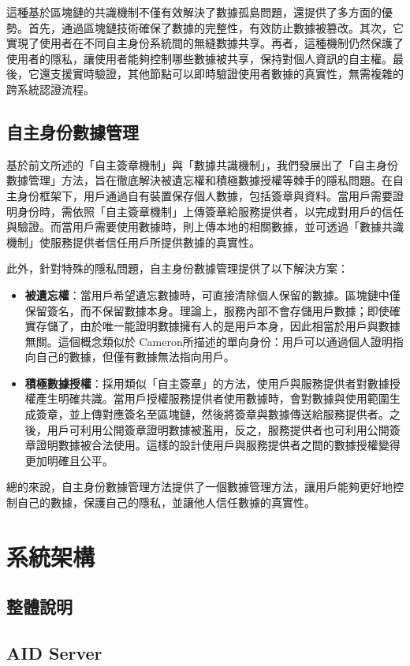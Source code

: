 這種基於區塊鏈的共識機制不僅有效解決了數據孤島問題，還提供了多方面的優勢。首先，通過區塊鏈技術確保了數據的完整性，有效防止數據被篡改。其次，它實現了使用者在不同自主身份系統間的無縫數據共享。再者，這種機制仍然保護了使用者的隱私，讓使用者能夠控制哪些數據被共享，保持對個人資訊的自主權。最後，它還支援實時驗證，其他節點可以即時驗證使用者數據的真實性，無需複雜的跨系統認證流程。
\subsection{自主身份數據管理}
基於前文所述的「自主簽章機制」與「數據共識機制」，我們發展出了「自主身份數據管理」方法，旨在徹底解決被遺忘權和積極數據授權等棘手的隱私問題。在自主身份框架下，用戶通過自有裝置保存個人數據，包括簽章與資料。當用戶需要證明身份時，需依照「自主簽章機制」上傳簽章給服務提供者，以完成對用戶的信任與驗證。而當用戶需要使用數據時，則上傳本地的相關數據，並可透過「數據共識機制」使服務提供者信任用戶所提供數據的真實性。

此外，針對特殊的隱私問題，自主身份數據管理提供了以下解決方案：
\begin{itemize}
  \item \textbf{被遺忘權}：當用戶希望遺忘數據時，可直接清除個人保留的數據。區塊鏈中僅保留簽名，而不保留數據本身。理論上，服務內部不會存儲用戶數據；即使確實存儲了，由於唯一能證明數據擁有人的是用戶本身，因此相當於用戶與數據無關。這個概念類似於 Cameron\cite{cameron2005laws}所描述的單向身份：用戶可以通過個人證明指向自己的數據，但僅有數據無法指向用戶。
  \item \textbf{積極數據授權}：採用類似「自主簽章」的方法，使用戶與服務提供者對數據授權產生明確共識。當用戶授權服務提供者使用數據時，會對數據與使用範圍生成簽章，並上傳對應簽名至區塊鏈，然後將簽章與數據傳送給服務提供者。之後，用戶可利用公開簽章證明數據被濫用，反之，服務提供者也可利用公開簽章證明數據被合法使用。這樣的設計使用戶與服務提供者之間的數據授權變得更加明確且公平。
\end{itemize}

總的來說，自主身份數據管理方法提供了一個數據管理方法，讓用戶能夠更好地控制自己的數據，保護自己的隱私，並讓他人信任數據的真實性。
\section{系統架構}
\subsection{整體說明}
\subsection{AID Server}
